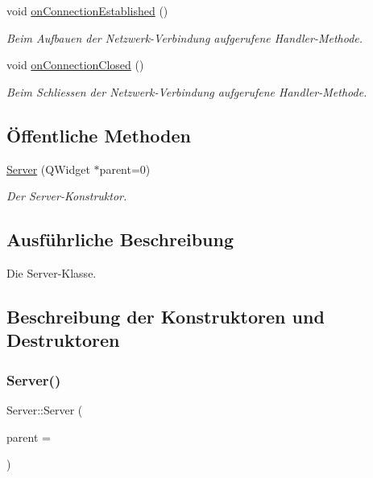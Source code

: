 \begin{DoxyCompactItemize}
\hypertarget{class_server_a6e9f425b8fc676a224daf08b2f8cc81c}{}\label{class_server_a6e9f425b8fc676a224daf08b2f8cc81c} 
void \hyperlink{class_server_a6e9f425b8fc676a224daf08b2f8cc81c}{on\+Connection\+Established} ()
\begin{DoxyCompactList}\small\item\em Beim Aufbauen der Netzwerk-\/\+Verbindung aufgerufene Handler-\/\+Methode. \end{DoxyCompactList}\item 
\hypertarget{class_server_acd7ae4112f7be04a194781a1fb7d4e38}{}\label{class_server_acd7ae4112f7be04a194781a1fb7d4e38} 
void \hyperlink{class_server_acd7ae4112f7be04a194781a1fb7d4e38}{on\+Connection\+Closed} ()
\begin{DoxyCompactList}\small\item\em Beim Schliessen der Netzwerk-\/\+Verbindung aufgerufene Handler-\/\+Methode. \end{DoxyCompactList}\end{DoxyCompactItemize}
\subsection*{Öffentliche Methoden}
\begin{DoxyCompactItemize}
\item 
\hyperlink{class_server_a0bf03b27b29ae4b969ec903f95041a17}{Server} (Q\+Widget $\ast$parent=0)
\begin{DoxyCompactList}\small\item\em Der Server-\/\+Konstruktor. \end{DoxyCompactList}\end{DoxyCompactItemize}


\subsection{Ausführliche Beschreibung}
Die Server-\/\+Klasse. 

\subsection{Beschreibung der Konstruktoren und Destruktoren}
\hypertarget{class_server_a0bf03b27b29ae4b969ec903f95041a17}{}\label{class_server_a0bf03b27b29ae4b969ec903f95041a17} 
\subsubsection{\texorpdfstring{Server()}{Server()}}
{\footnotesize\ttfamily Server\+::\+Server (\begin{DoxyParamCaption}\item[{Q\+Widget $\ast$}]{parent = {} }\end{DoxyParamCaption})\hspace{0.3cm}{\ttfamily [explicit]}}



